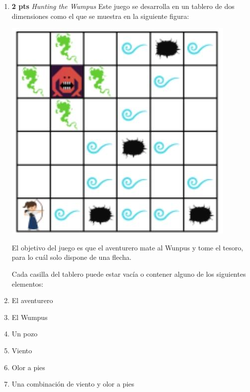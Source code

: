 \documentclass[11pt,letterpaper]{article}
\begin{document}
\begin{enumerate}
\item{\bf 2 pts}  {\it Hunting the Wumpus} Este juego se desarrolla en un tablero de dos dimensiones como el que se muestra en la siguiente figura:
  
  \begin{center}
    \includegraphics[scale=.3]{wumpus1}
  \end{center}
  
  El objetivo del juego es que el aventurero mate al Wunpus y tome el tesoro, para lo cuál solo dispone de una flecha.
  
  Cada casilla del tablero  puede estar vacía o contener alguno de los siguientes elementos:
  \bi
\item El aventurero
\item El Wumpus
\item Un pozo
\item Viento
\item Olor a pies
\item Una combinación de viento y olor a pies
  \ei
  

\end{enumerate}
\end{document}

